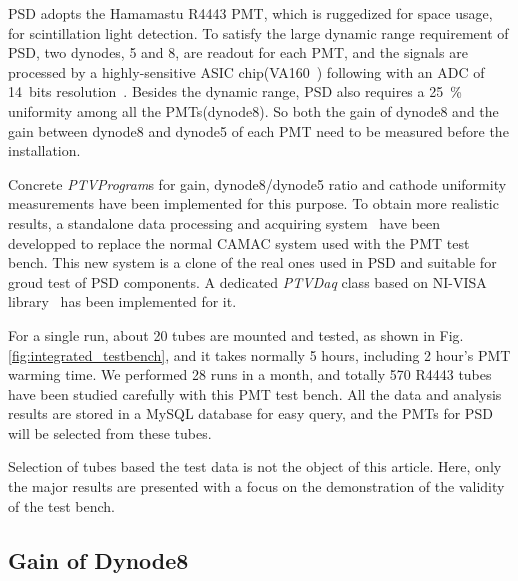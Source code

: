 \documentclass[review, times]{elsarticle}
\begin{document}
PSD adopts the Hamamastu R4443 PMT, which is ruggedized for space usage, for scintillation light detection. 
To satisfy the large dynamic range requirement of PSD, two dynodes, 5 and 8, are readout for each PMT, and the signals are processed by a highly-sensitive ASIC chip(VA160~\cite{va160}) following with an ADC of 14~bits resolution~\cite{fee}. 
Besides the dynamic range, PSD also requires a \SI{25}{\percent} uniformity among all the PMTs(dynode8).%
So both the gain of dynode8 and the gain between dynode8 and dynode5 of each PMT need to be measured before the installation.

Concrete \textit{PTVProgram}s for gain, dynode8/dynode5 ratio and cathode uniformity measurements have been implemented for this purpose.
To obtain more realistic results, a standalone data processing and acquiring system~\cite{fee} have been developped to replace the normal CAMAC system used with the PMT test bench. 
This new system is a clone of the real ones used in PSD and suitable for groud test of PSD components.
A dedicated \textit{PTVDaq} class based on NI-VISA library~\cite{ni_visa} has been implemented for it.

For a single run, about 20 tubes are mounted and tested, as shown in Fig.\ref{fig:integrated_testbench}, and it takes normally 5 hours, including 2 hour's PMT warming time. 
We performed 28 runs in a month, and totally 570 R4443 tubes have been studied carefully with this PMT test bench. 
All the data and analysis results are stored in a MySQL database for easy query, and the PMTs for PSD will be selected from these tubes.

Selection of tubes based the test data is not the object of this article.
Here, only the major results are presented with a focus on the demonstration of the validity of the test bench. 

\subsection{Gain of Dynode8}
\label{sec:psd_gain}
\end{document}
